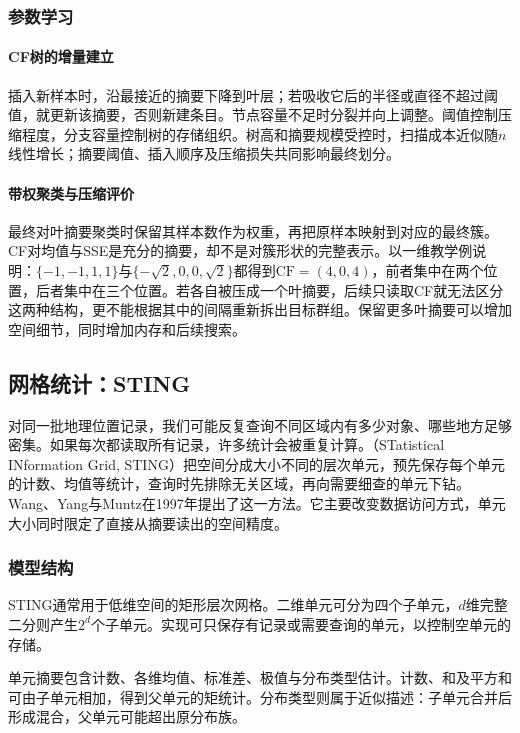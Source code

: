 \subsubsection{参数学习}

\paragraph{CF树的增量建立}

插入新样本时，沿最接近的摘要下降到叶层；若吸收它后的半径或直径不超过阈值，就更新该摘要，否则新建条目。节点容量不足时分裂并向上调整。阈值控制压缩程度，分支容量控制树的存储组织。树高和摘要规模受控时，扫描成本近似随$n$线性增长；摘要阈值、插入顺序及压缩损失共同影响最终划分。

\paragraph{带权聚类与压缩评价}

最终对叶摘要聚类时保留其样本数作为权重，再把原样本映射到对应的最终簇。CF对均值与SSE是充分的摘要，却不是对簇形状的完整表示。以一维教学例说明：$\{-1,-1,1,1\}$与$\{-\sqrt2,0,0,\sqrt2\}$都得到$\mathrm{CF}=(4,0,4)$，前者集中在两个位置，后者集中在三个位置。若各自被压成一个叶摘要，后续只读取CF就无法区分这两种结构，更不能根据其中的间隔重新拆出目标群组。保留更多叶摘要可以增加空间细节，同时增加内存和后续搜索。
\subsection{网格统计：STING}

对同一批地理位置记录，我们可能反复查询不同区域内有多少对象、哪些地方足够密集。如果每次都读取所有记录，许多统计会被重复计算。（STatistical INformation Grid, STING）把空间分成大小不同的层次单元，预先保存每个单元的计数、均值等统计，查询时先排除无关区域，再向需要细查的单元下钻。Wang、Yang与Muntz在1997年提出了这一方法。它主要改变数据访问方式，单元大小同时限定了直接从摘要读出的空间精度。

\subsubsection{模型结构}

STING通常用于低维空间的矩形层次网格。二维单元可分为四个子单元，$d$维完整二分则产生$2^d$个子单元。实现可只保存有记录或需要查询的单元，以控制空单元的存储。

单元摘要包含计数、各维均值、标准差、极值与分布类型估计。计数、和及平方和可由子单元相加，得到父单元的矩统计。分布类型则属于近似描述：子单元合并后形成混合，父单元可能超出原分布族。

